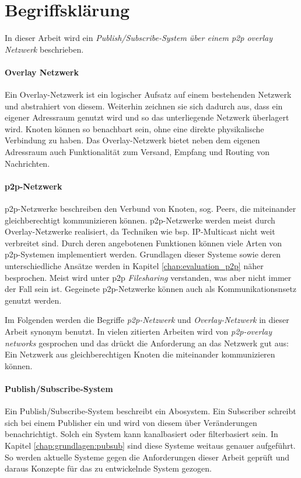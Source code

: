 \section{Begriffsklärung}
In dieser Arbeit wird ein \emph{Publish/Subscribe-System über einem \ac{p2p} overlay Netzwerk} beschrieben.

\paragraph{Overlay Netzwerk} Ein Overlay-Netzwerk ist ein logischer Aufsatz auf einem bestehenden Netzwerk und abstrahiert von diesem. Weiterhin zeichnen sie sich dadurch aus, dass ein eigener Adressraum genutzt wird und so das unterliegende Netzwerk überlagert wird. Knoten können so benachbart sein, ohne eine direkte physikalische Verbindung zu haben. Das Overlay-Netzwerk bietet neben dem eigenen Adressraum auch Funktionalität zum Versand, Empfang und Routing von Nachrichten.


\paragraph{\ac{p2p}-Netzwerk} p2p-Netzwerke beschreiben den Verbund von Knoten, sog. Peers, die miteinander gleichberechtigt kommunizieren können. p2p-Netzwerke werden meist durch Overlay-Netzwerke realisiert, da Techniken wie bsp. IP-Multicast nicht weit verbreitet sind. Durch deren angebotenen Funktionen können viele Arten von p2p-Systemen implementiert werden. Grundlagen dieser Systeme sowie deren unterschiedliche Ansätze werden in Kapitel \ref{chap:evaluation_p2p} näher besprochen. Meist wird unter p2p \emph{Filesharing} verstanden, was aber nicht immer der Fall sein ist. Gegeinete p2p-Netzwerke können auch als Kommunikationsnsetz genutzt werden.


Im Folgenden werden die Begriffe \emph{p2p-Netzwerk} und \emph{Overlay-Netzwerk} in dieser Arbeit synonym benutzt. In vielen zitierten Arbeiten wird von \emph{p2p-overlay networks} gesprochen und das drückt die Anforderung an das Netzwerk gut aus: Ein Netzwerk aus gleichberechtigen Knoten die miteinander kommunizieren können.

\paragraph{Publish/Subscribe-System} Ein Publish/Subscribe-System beschreibt ein Abosystem. Ein Subscriber schreibt sich bei einem Publisher ein und wird von diesem über Veränderungen benachrichtigt. Solch ein System kann kanalbasiert oder filterbasiert sein. In Kapitel \ref{chap:grundlagen:pubsub} sind diese Systeme weitaus genauer aufgeführt. So werden aktuelle Systeme gegen die Anforderungen dieser Arbeit geprüft und daraus Konzepte für das zu entwickelnde System gezogen.

